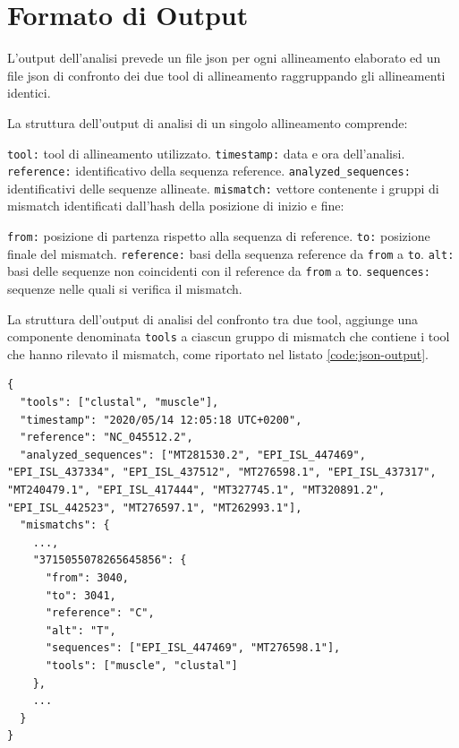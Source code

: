\documentclass[11pt,italian]{article}
\makeatletter
\newcommand*{\lstitem}[1][]{%
  \setbox0\hbox\bgroup
    \patchcmd{\lst@InlineM}{\@empty}{\@empty\egroup\item[\usebox0]\leavevmode\ignorespaces}{}{}%
    \lstinline[#1]%
}
\makeatother
\begin{document}
\section{Formato di Output}
L'output dell'analisi prevede un file json per ogni allineamento elaborato ed un file json di confronto dei due tool di allineamento raggruppando gli allineamenti identici.

La struttura dell'output di analisi di un singolo allineamento comprende:
\begin{description}
  \lstitem{tool:} tool di allineamento utilizzato.
  \lstitem{timestamp:} data e ora dell'analisi.
  \lstitem{reference:} identificativo della sequenza reference.
  \lstitem{analyzed_sequences:} identificativi delle sequenze allineate.
  \lstitem{mismatch:} vettore contenente i gruppi di mismatch identificati dall'hash della posizione di inizio e fine:
  \begin{description}
    \lstitem{from:} posizione di partenza rispetto alla sequenza di reference.
    \lstitem{to:} posizione finale del mismatch.
    \lstitem{reference:} basi della sequenza reference da \lstinline{from} a \lstinline{to}.
    \lstitem{alt:} basi delle sequenze non coincidenti con il reference da \lstinline{from} a \lstinline{to}.
    \lstitem{sequences:} sequenze nelle quali si verifica il mismatch.
  \end{description}
\end{description}

\noindent
La struttura dell'output di analisi del confronto tra due tool, aggiunge una componente denominata \lstinline{tools} a ciascun gruppo di mismatch che contiene i tool che hanno rilevato il mismatch, come riportato nel listato \ref{code:json-output}.

\begin{lstlisting}[basicstyle=\small\ttfamily,caption=Esempio di output,label=code:json-output]
{
  "tools": ["clustal", "muscle"],
  "timestamp": "2020/05/14 12:05:18 UTC+0200",
  "reference": "NC_045512.2",
  "analyzed_sequences": ["MT281530.2", "EPI_ISL_447469", "EPI_ISL_437334", "EPI_ISL_437512", "MT276598.1", "EPI_ISL_437317", "MT240479.1", "EPI_ISL_417444", "MT327745.1", "MT320891.2", "EPI_ISL_442523", "MT276597.1", "MT262993.1"],
  "mismatchs": {
    ...,
    "3715055078265645856": {
      "from": 3040,
      "to": 3041,
      "reference": "C",
      "alt": "T",
      "sequences": ["EPI_ISL_447469", "MT276598.1"],
      "tools": ["muscle", "clustal"]
    },
    ...
  }
}
\end{lstlisting}
\end{document}
